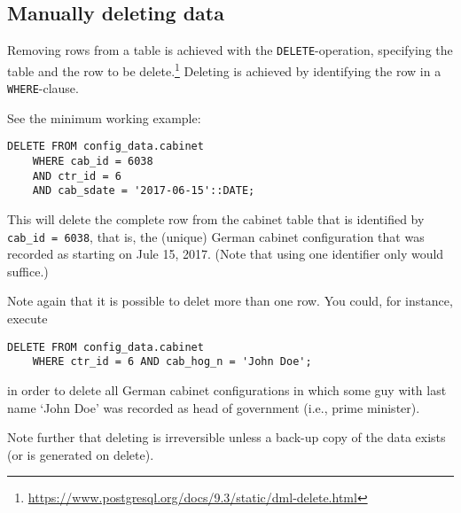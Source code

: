 \subsection{Manually deleting data}

Removing rows from a table is achieved with the \texttt{DELETE}-operation, specifying the table and the row to be delete.\footnote{\url{https://www.postgresql.org/docs/9.3/static/dml-delete.html}}
Deleting is achieved by identifying the row in a \texttt{WHERE}-clause. 

See the minimum working example:
\begin{lstlisting}[language=postgreSQL]
DELETE FROM config_data.cabinet 
	WHERE cab_id = 6038 
	AND ctr_id = 6 
	AND cab_sdate = '2017-06-15'::DATE;
\end{lstlisting}

This will delete the complete row from the cabinet table that is identified by \texttt{cab\_id = 6038}, that is, the (unique) German cabinet configuration that was recorded as starting on Jule 15, 2017. (Note that using one identifier only would suffice.)

Note again that it is possible to delet more than one row. 
You could, for instance, execute
\begin{lstlisting}[language=postgreSQL]
DELETE FROM config_data.cabinet 
	WHERE ctr_id = 6 AND cab_hog_n = 'John Doe';
\end{lstlisting}
in order to delete all German cabinet configurations in which some guy with last name `John Doe' was recorded as head of government (i.e., prime minister).

Note further that deleting is irreversible unless a back-up copy of the data exists (or is generated on delete).

